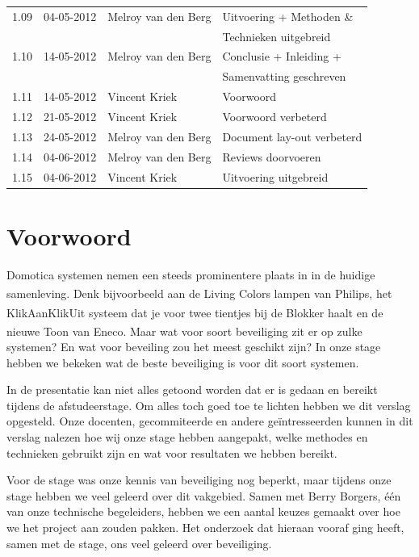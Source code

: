 \documentclass[]{article}
\begin{document}
\begin{tabular}{|| l | l | l | l ||}
    1.09    &04-05-2012  &Melroy van den Berg &Uitvoering + Methoden \&        \\ 
            &            &                    &Technieken uitgebreid           \\\hline
    1.10    &14-05-2012  &Melroy van den Berg &Conclusie + Inleiding +         \\
            &            &                    &Samenvatting geschreven         \\\hline 
    1.11    &14-05-2012  &Vincent Kriek       &Voorwoord                       \\\hline
    1.12    &21-05-2012  &Vincent Kriek       &Voorwoord verbeterd             \\\hline
    1.13    &24-05-2012  &Melroy van den Berg &Document lay-out verbeterd      \\\hline
    1.14    &04-06-2012  &Melroy van den Berg &Reviews doorvoeren	           \\\hline
    1.15    &04-06-2012  &Vincent Kriek       &Uitvoering uitgebreid           \\\hline
\end{tabular}

\newpage
\thispagestyle{empty}
\section*{Voorwoord}
Domotica systemen nemen een steeds prominentere plaats in in de huidige
samenleving. Denk bijvoorbeeld aan de Living Colors lampen van
Philips\textsuperscript{\texttrademark}, het
KlikAanKlikUit\textsuperscript{\textregistered} systeem dat je voor twee
tientjes bij de Blokker haalt en de nieuwe
Toon\textsuperscript{\textregistered} van Eneco. Maar wat voor soort beveiliging
zit er op zulke systemen?  En wat voor beveiling zou het meest geschikt zijn? In
onze stage hebben we bekeken wat de beste beveiliging is voor dit soort
systemen.

In de presentatie kan niet alles getoond worden dat er is gedaan en bereikt
tijdens de afstudeerstage. Om alles toch goed toe te lichten hebben we dit
verslag opgesteld.  Onze docenten, gecommiteerde en andere ge\"intresseerden
kunnen in dit verslag nalezen hoe wij onze stage hebben aangepakt, welke
methodes en technieken gebruikt zijn en wat voor resultaten we hebben
bereikt.

Voor de stage was onze kennis van beveiliging nog beperkt,
maar tijdens onze stage hebben we veel geleerd over dit vakgebied. Samen met
Berry Borgers, \'e\'en van onze technische begeleiders, hebben we een aantal keuzes
gemaakt over hoe we het project aan zouden pakken. Het onderzoek dat hieraan
vooraf ging heeft, samen met de stage, ons veel geleerd over beveiliging.
\end{document}

